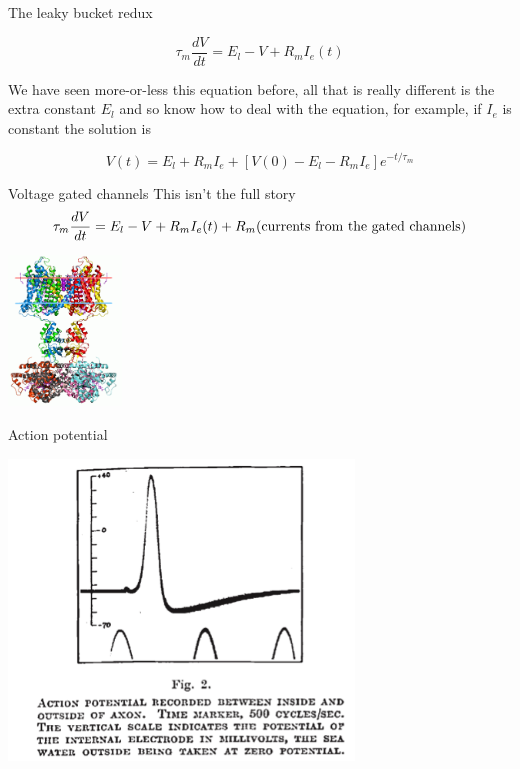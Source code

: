 \documentclass{beamer}
\newcommand{\crish}{\color{reddish}}
\newcommand{\cbla}{\color{black}}
\newcommand{\cred}{\color{red}}
\begin{document}
\begin{frame}{The leaky bucket redux}

  \crish
  $$\tau_m\frac{dV}{dt}=E_l-V+R_mI_e(t)$$
  \cbla

  We have seen more-or-less this equation before, all that is really
  different is the extra constant \crish$E_l$\cbla{} and so know how to
  deal with the equation, for example, if \crish{}$I_e$\cbla{} is constant the
  solution is\crish

  $$V(t)=E_l+R_mI_e+[V(0)-E_l-R_mI_e]e^{-t/\tau_m}$$
  \cbla{}
  
\end{frame}

\begin{frame}{Voltage gated channels}
  This isn't the full story
  \crish$$\tau_m\frac{dV}{dt}=E_l-V+R_mI_e(t)+R_m(\cred{}\mbox{currents from the gated channels}\crish)$$\cbla{}
  \begin{center}
    \includegraphics[height=4cm]{2r9r_opm.png}
\end{center}
    \vfill
  \end{frame}


\begin{frame}{Action potential}
  \begin{center}
    \includegraphics[height=8cm]{HH_spike.png}
\end{center}
    \vfill
  \end{frame}
\end{document}
